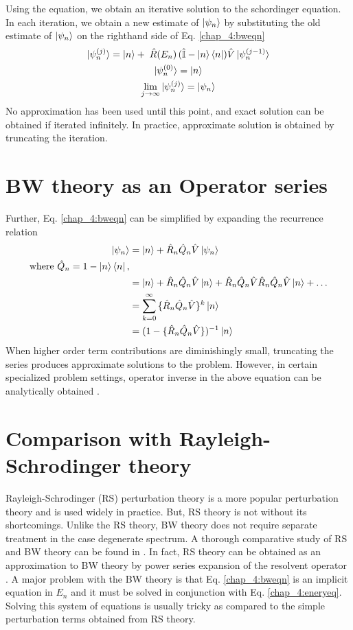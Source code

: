 Using the equation, we obtain an iterative solution to the schordinger equation. 
In each iteration, we obtain a new estimate of $\ket{\psi_n}$ by substituting the old estimate of $\ket{\psi_n}$ on the righthand side of Eq. \eqref{chap_4:bweqn}
\begin{gather}
  \label{chap_4:itereq} \ket{\psi_{n}^{(j)}} = \ket{n} + \; \hat{R}(E_{n})\,(\hat{\mathbb{I}} - \ket{n}\bra{n})\hat{V}\ket{\psi_{n}^{(j-1)}} \\
  \ket{\psi_{n}^{(0)}} = \ket{n} \nonumber \\
  \lim_{j\rightarrow \infty} \ket{\psi_{n}^{(j)}} = \ket{\psi_n} \nonumber
\end{gather} No approximation has been used until this point, and exact solution can be obtained if iterated infinitely. 
In practice, approximate solution is obtained by truncating the iteration.

\section{BW theory as an Operator series}
Further, Eq. \eqref{chap_4:bweqn} can be simplified by expanding the recurrence relation
\begin{align}
 \ket{\psi_n} &= \ket{n} + \hat{R}_{n}\hat{Q}_{n}\hat{V}\ket{\psi_n} \nonumber\\
 \text{where } \hat{Q}_{n} = \mathrm{1} - \ket{n}\bra{n}, \nonumber\\
 &= \ket{n} + \hat{R}_{n}\hat{Q}_{n}\hat{V}\ket{n} + \hat{R}_{n}\hat{Q}_{n}\hat{V}\hat{R}_{n}\hat{Q}_{n}\hat{V}\ket{n} + \dots \nonumber\\
 &= \sum_{k=0}^{\infty}{\{\hat{R}_{n}\hat{Q}_{n}\hat{V}\}^k \ket{n}} \nonumber\\ 
 &= (\mathrm{1} - \{\hat{R}_{n}\hat{Q}_{n}\hat{V}\})^{-1} \ket{n}
\end{align}
When higher order term contributions are diminishingly small, truncating the series produces approximate solutions 
to the problem. However, in certain specialized problem settings, operator inverse in the above equation can be analytically obtained \cite{silvert1972comparison}.

\section{Comparison with Rayleigh-Schrodinger theory}
Rayleigh-Schrodinger (RS) perturbation theory is a more popular perturbation theory and is used widely in practice. But, RS theory is not without its shortcomings. 
Unlike the RS theory, BW theory does not require separate treatment in the case degenerate spectrum. A thorough comparative study of RS and BW theory can be found in \parencite{silvert1972comparison}. 
In fact, RS theory can be obtained as an approximation to BW theory by power series expansion of the resolvent operator \cite{wilson2009brillouin}. A major problem with
the BW theory is that Eq. \eqref{chap_4:bweqn} is an implicit equation in $E_n$ and it must be solved in conjunction with Eq. \eqref{chap_4:eneryeq}. Solving this system of
equations is usually tricky as compared to the simple perturbation terms obtained from RS theory.

